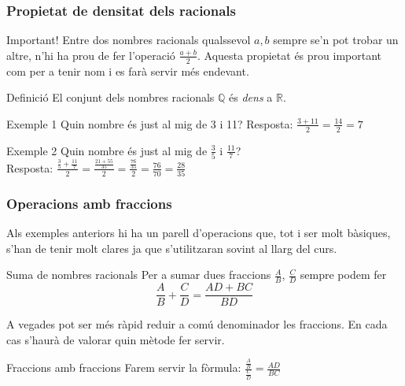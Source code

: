 \documentclass{beamer}
\begin{document}
\begin{frame}\frametitle{Propietat de densitat dels racionals}
\begin{alertblock}{Important!}
Entre dos nombres racionals qualssevol $a, b$ sempre se'n pot
trobar un altre, n'hi ha prou de fer l'operació $\frac{a+b}{2}$.
Aquesta propietat és prou important com per a tenir nom i es farà
servir més endevant.
\end{alertblock}
\end{frame}
\begin{frame}
\begin{block}{Definició}
El conjunt dels nombres racionals $\mathbb{Q}$ és \emph{dens} a
$\mathbb{R}$.
\end{block}\pause
\begin{exampleblock}{Exemple 1}
Quin nombre és just al mig de 3 i 11? Resposta:
$\frac{3+11}{2}=\frac{14}{2}=7$
\end{exampleblock}\pause
\begin{exampleblock}{Exemple 2}
Quin nombre és just al mig de $\frac{3}{5}$ i $\frac{11}{7}$?\\
Resposta:
$\frac{\frac{3}{5}+\frac{11}{7}}{2}=\frac{\frac{21+55}{35}}{2}=\frac{\frac{76}{35}}{2}=\frac{76}{70}=\frac{28}{35}$

\end{exampleblock}
\end{frame}
\begin{frame}\frametitle{Operacions amb fraccions}
Als exemples anteriors hi ha un parell d'operacions que, tot i ser
molt bàsiques, s'han de tenir molt clares ja que s'utilitzaran
sovint al llarg del curs.\pause
\begin{block}{Suma de nombres racionals}
Per a sumar dues fraccions $\frac{A}{B}$, $\frac{C}{D}$ sempre
podem fer $$\frac{A}{B}+\frac{C}{D}=\frac{AD+BC}{BD}$$
\end{block}\pause
\small A vegades pot ser més ràpid reduir a comú denominador les
fraccions. En cada cas s'haurà de valorar quin mètode fer
servir.\pause

\normalsize
\begin{block}{Fraccions amb fraccions}
Farem servir la fòrmula:
$\frac{\frac{A}{B}}{\frac{C}{D}}=\frac{AD}{BC}$
\end{block}
\end{frame}
\end{document}
